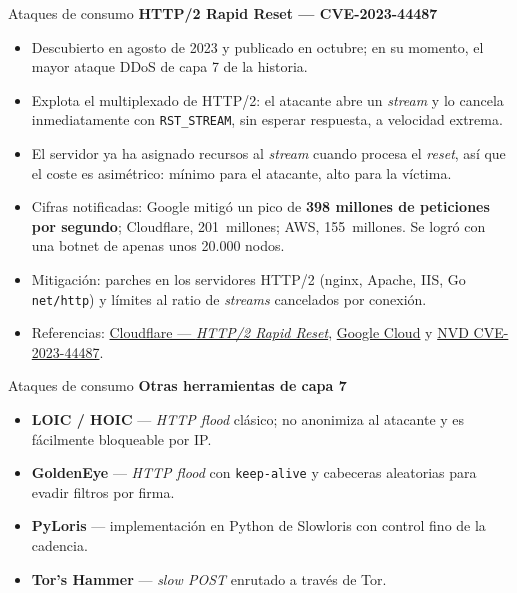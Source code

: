 \documentclass[aspectratio=169,11pt]{beamer}
\newcommand{\cmd}[1]{\texttt{\color{uznavy}#1}}
\newcommand{\subt}[1]{{\color{uznavy}\bfseries #1}\par\smallskip}
\begin{document}
\begin{frame}[allowframebreaks]{Ataques de consumo}
\footnotesize
\subt{HTTP/2 Rapid Reset --- CVE-2023-44487}
  \begin{itemize}
  \item Descubierto en agosto de 2023 y publicado en octubre; en su momento, el mayor ataque DDoS de capa 7 de la historia.
  \item Explota el multiplexado de HTTP/2: el atacante abre un \emph{stream} y lo cancela inmediatamente con \cmd{RST\_STREAM}, sin esperar respuesta, a velocidad extrema.
  \item El servidor ya ha asignado recursos al \emph{stream} cuando procesa el \emph{reset}, así que el coste es asimétrico: mínimo para el atacante, alto para la víctima.
  \item Cifras notificadas: Google mitigó un pico de \textbf{398 millones de peticiones por segundo}; Cloudflare, 201~millones; AWS, 155~millones. Se logró con una botnet de apenas unos 20.000 nodos.
  \item Mitigación: parches en los servidores HTTP/2 (nginx, Apache, IIS, Go \cmd{net/http}) y límites al ratio de \emph{streams} cancelados por conexión.
  \item Referencias: \href{https://blog.cloudflare.com/technical-breakdown-http2-rapid-reset-ddos-attack/}{Cloudflare --- \emph{HTTP/2 Rapid Reset}}, \href{https://cloud.google.com/blog/products/identity-security/google-cloud-mitigated-largest-ddos-attack-peaking-above-398-million-rps/}{Google Cloud} y \href{https://nvd.nist.gov/vuln/detail/CVE-2023-44487}{NVD CVE-2023-44487}.
  \end{itemize}
\end{frame}

\begin{frame}{Ataques de consumo}
\small
\subt{Otras herramientas de capa 7}
  \begin{itemize}
  \item \textbf{LOIC / HOIC} --- \emph{HTTP flood} clásico; no anonimiza al atacante y es fácilmente bloqueable por IP.
  \item \textbf{GoldenEye} --- \emph{HTTP flood} con \cmd{keep-alive} y cabeceras aleatorias para evadir filtros por firma.
  \item \textbf{PyLoris} --- implementación en Python de Slowloris con control fino de la cadencia.
  \item \textbf{Tor's Hammer} --- \emph{slow POST} enrutado a través de Tor.
  \end{itemize}
\end{frame}
\end{document}
